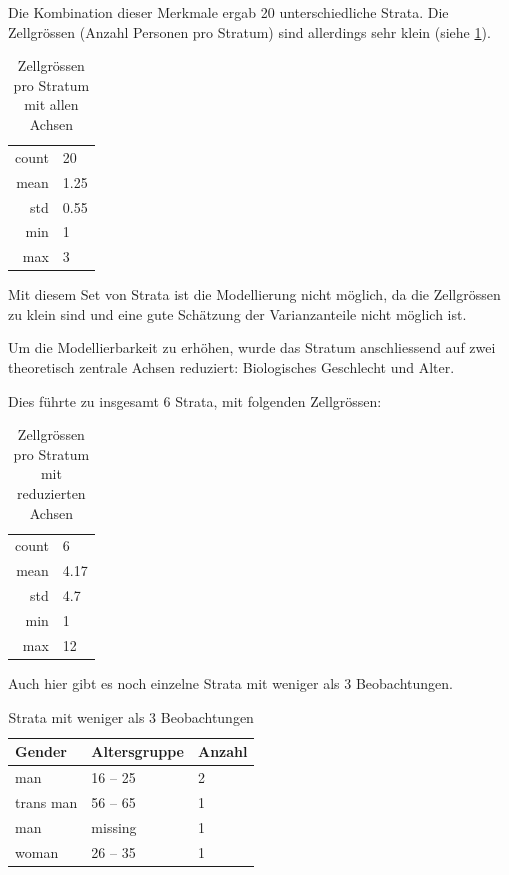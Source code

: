 Die Kombination dieser Merkmale ergab 20 unterschiedliche Strata. Die Zellgrössen (Anzahl Personen pro Stratum) sind allerdings sehr klein (siehe \cref{tab:zellgroessen_alle_achsen}).

\begin{table}[h]
    \centering
    \begin{tabular}{rl}
        count & 20 \\
        mean & 1.25 \\
        std & 0.55 \\
        min & 1 \\
        max & 3 \\
    \end{tabular}
    \caption{Zellgrössen pro Stratum mit allen Achsen}
    \label{tab:zellgroessen_alle_achsen}
\end{table}

Mit diesem Set von Strata ist die Modellierung nicht möglich, da die Zellgrössen zu klein sind und eine gute Schätzung der Varianzanteile nicht möglich ist.

Um die Modellierbarkeit zu erhöhen, wurde das Stratum anschliessend auf zwei theoretisch zentrale Achsen reduziert: Biologisches Geschlecht und Alter.

Dies führte zu insgesamt $6$ Strata, mit folgenden Zellgrössen:

\begin{table}[h]
    \centering
    \begin{tabular}{rl}
        count & 6 \\
        mean & 4.17 \\
        std & 4.7 \\
        min & 1 \\
        max & 12 \\
    \end{tabular}
    \caption{Zellgrössen pro Stratum mit reduzierten Achsen}
    \label{tab:zellgroessen_reduzierte_achsen}
\end{table}

Auch hier gibt es noch einzelne Strata mit weniger als 3 Beobachtungen.

\begin{table}[h]
    \centering
    \begin{tabular}{lll}
        Gender & Altersgruppe & Anzahl \\
        \hline
        man & 16 -- 25 & 2 \\
        trans man & 56 -- 65 & 1 \\
        man & missing & 1 \\
        woman & 26 -- 35 & 1 \\
    \end{tabular}
    \caption{Strata mit weniger als 3 Beobachtungen}
    \label{tab:zellgroessen_reduzierte_achsen_kleine_strata}
\end{table}

